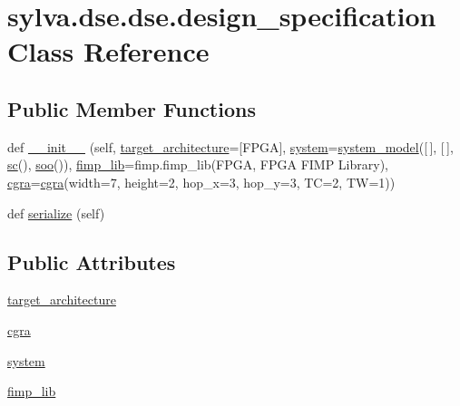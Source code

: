 \hypertarget{classsylva_1_1dse_1_1dse_1_1design__specification}{}\section{sylva.\+dse.\+dse.\+design\+\_\+specification Class Reference}
\label{classsylva_1_1dse_1_1dse_1_1design__specification}
\subsection*{Public Member Functions}
\begin{DoxyCompactItemize}
\item 
def \hyperlink{classsylva_1_1dse_1_1dse_1_1design__specification_a663ec78bf7e1432ce1bcdb32272e5c78}{\+\_\+\+\_\+init\+\_\+\+\_\+} (self, \hyperlink{classsylva_1_1dse_1_1dse_1_1design__specification_abbf25f6a1f9aaa73f5e29885b8bdd8a6}{target\+\_\+architecture}=\mbox{[}\textquotesingle{}F\+P\+GA\textquotesingle{}\mbox{]}, \hyperlink{classsylva_1_1dse_1_1dse_1_1design__specification_a96856cd3116b9f67b8778fc9e3968632}{system}=\hyperlink{classsylva_1_1dse_1_1dse_1_1system__model}{system\+\_\+model}(\mbox{[}$\,$\mbox{]}, \mbox{[}$\,$\mbox{]}, \hyperlink{namespacesylva_1_1dse_1_1dse_ac2d9fdcc3f7fd0bad1900fa0a813dff4}{sc}(), \hyperlink{namespacesylva_1_1dse_1_1dse_ab54fbae03bc2c432fecd4486e623af71}{soo}()), \hyperlink{classsylva_1_1dse_1_1dse_1_1design__specification_a427b7d0d227aa039fd4aa12a5d935ca1}{fimp\+\_\+lib}=fimp.\+fimp\+\_\+lib(\textquotesingle{}F\+P\+GA\textquotesingle{}, \textquotesingle{}F\+P\+GA F\+I\+MP Library\textquotesingle{}), \hyperlink{classsylva_1_1dse_1_1dse_1_1design__specification_af2a020bde2455890f0bafc6519b65712}{cgra}=\hyperlink{classsylva_1_1dse_1_1dse_1_1design__specification_af2a020bde2455890f0bafc6519b65712}{cgra}(width=7, height=2, hop\+\_\+x=3, hop\+\_\+y=3, TC=2, TW=1))
\item 
def \hyperlink{classsylva_1_1dse_1_1dse_1_1design__specification_add24965827d00b11032bd22aa2606169}{serialize} (self)
\end{DoxyCompactItemize}
\subsection*{Public Attributes}
\begin{DoxyCompactItemize}
\item 
\hyperlink{classsylva_1_1dse_1_1dse_1_1design__specification_abbf25f6a1f9aaa73f5e29885b8bdd8a6}{target\+\_\+architecture}
\item 
\hyperlink{classsylva_1_1dse_1_1dse_1_1design__specification_af2a020bde2455890f0bafc6519b65712}{cgra}
\item 
\hyperlink{classsylva_1_1dse_1_1dse_1_1design__specification_a96856cd3116b9f67b8778fc9e3968632}{system}
\item 
\hyperlink{classsylva_1_1dse_1_1dse_1_1design__specification_a427b7d0d227aa039fd4aa12a5d935ca1}{fimp\+\_\+lib}
\end{DoxyCompactItemize}


